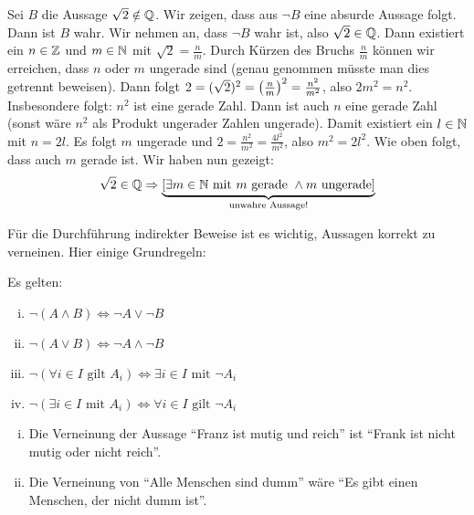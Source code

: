 \begin{beweis}
	Sei $B$ die Aussage $\sqrt{2} \notin \mathbb{Q}$.
	Wir zeigen, dass aus $\neg B$ eine absurde Aussage folgt.
	Dann ist $B$ wahr.
	Wir nehmen an, dass $\neg B$ wahr ist, also $\sqrt{2} \in \mathbb{Q}$.
	Dann existiert ein $n \in \mathbb{Z}$ und $m \in \mathbb{N}$ mit $\sqrt{2} = \frac{n}{m}$.
	Durch Kürzen des Bruchs $\frac{n}{m}$ können wir erreichen, dass $n$ oder $m$ ungerade sind (genau genommen müsste man dies getrennt beweisen).
	Dann folgt $2 = (\sqrt{2})^2 = \left(\frac{n}{m}\right)^2 = \frac{n^2}{m^2}$, also $2m^2 = n^2$.
	Insbesondere folgt: $n^2$ ist eine gerade Zahl.
	Dann ist auch $n$ eine gerade Zahl (sonst wäre $n^2$ als Produkt ungerader Zahlen ungerade).
	Damit existiert ein $l \in \mathbb{N}$ mit $n = 2l$.
	Es folgt $m$ ungerade und $2 = \frac{n^2}{m^2} = \frac{4l^2}{m^2}$, also $m^2 = 2l^2$.
	Wie oben folgt, dass auch $m$ gerade ist.
	Wir haben nun gezeigt:
	\[
		\sqrt{2} \in \mathbb{Q} \Rightarrow {\underbrace{[\exists m \in \mathbb{N}\text{ mit } m \text{ gerade } \wedge m \text{ ungerade}]}_{\text{unwahre Aussage!}}} 
	\]
\end{beweis}

Für die Durchführung indirekter Beweise ist es wichtig, Aussagen korrekt zu verneinen.
Hier einige Grundregeln:

\begin{lemma}
	\label{lemma:I.1.6}
	Es gelten:
	\begin{enumerate}[(i)]
		\item $\neg(A \wedge B) \Leftrightarrow \neg A \vee \neg B$
		\item $\neg(A \vee B) \Leftrightarrow \neg A \wedge \neg B$
		\item $\neg(\forall i \in I \text{ gilt } A_i) \Leftrightarrow \exists i \in I \text{ mit } \neg A_i$
		\item $\neg(\exists i \in I \text{ mit } A_i) \Leftrightarrow \forall i \in I \text{ gilt } \neg A_i$
	\end{enumerate}
\end{lemma}

\begin{beispiel}
	\label{bsp:I.1.7}
	\begin{enumerate}[(i)]
		\item Die Verneinung der Aussage \enquote{Franz ist mutig und reich} ist \enquote{Frank ist nicht mutig oder nicht reich}.
		\item Die Verneinung von \enquote{Alle Menschen sind dumm} wäre \enquote{Es gibt einen Menschen, der nicht dumm ist}.
	\end{enumerate}
\end{beispiel}

